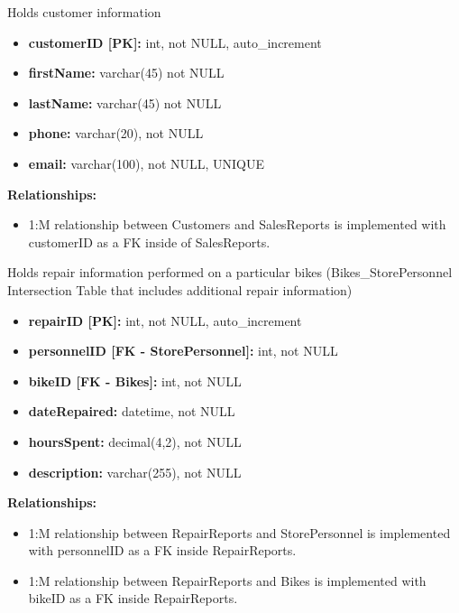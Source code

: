\documentclass{article}
\begin{document}
\begin{tcolorbox}[colback=secondarycolor, colframe=primarycolor, title=\textbf{Customers Table}]
Holds customer information
\vspace{0.2cm}

\begin{itemize}
  \item \textbf{customerID [PK]:} int, not NULL, auto\_increment
  \item \textbf{firstName:} varchar(45) not NULL
  \item \textbf{lastName:} varchar(45) not NULL
  \item \textbf{phone:} varchar(20), not NULL
  \item \textbf{email:} varchar(100), not NULL, UNIQUE
\end{itemize}
\vspace{0.2cm}

\textbf{Relationships:}
\vspace{0.2cm}
\begin{itemize}
  \item 1:M relationship between Customers and SalesReports is implemented with customerID as a FK inside of SalesReports.
\end{itemize}
\end{tcolorbox}

\vspace{0.5cm}

\begin{tcolorbox}[colback=secondarycolor, colframe=primarycolor, title=\textbf{RepairReports Table}]
Holds repair information performed on a particular bikes (Bikes\_StorePersonnel Intersection Table that includes additional repair information)
\vspace{0.2cm}

\begin{itemize}
  \item \textbf{repairID [PK]:} int, not NULL, auto\_increment
  \item \textbf{personnelID [FK - StorePersonnel]:} int, not NULL
  \item \textbf{bikeID [FK - Bikes]:} int, not NULL
  \item \textbf{dateRepaired:} datetime, not NULL
  \item \textbf{hoursSpent:} decimal(4,2), not NULL
  \item \textbf{description:} varchar(255), not NULL
\end{itemize}
\vspace{0.2cm}

\textbf{Relationships:}
\vspace{0.2cm}
\begin{itemize}
  \item 1:M relationship between RepairReports and StorePersonnel is implemented with personnelID as a FK inside RepairReports.
  \item 1:M relationship between RepairReports and Bikes is implemented with bikeID as a FK inside RepairReports.
\end{itemize}
\end{tcolorbox}
\end{document}
